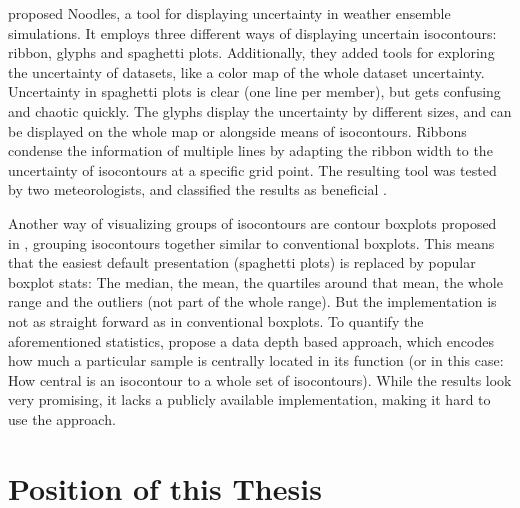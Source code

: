 \citeauthor{sanyal_noodles_2010} proposed Noodles, a tool for displaying uncertainty in weather ensemble simulations. 
It employs three different ways of displaying uncertain isocontours: ribbon, glyphs and spaghetti plots. 
Additionally, they added tools for exploring the uncertainty of datasets, like a color map of the whole dataset uncertainty.  
Uncertainty in spaghetti plots is clear (one line per member), but gets confusing and chaotic quickly. 
The glyphs display the uncertainty by different sizes,  and can be displayed on the whole map or alongside means of isocontours. 
Ribbons condense the information of multiple lines by adapting the ribbon width to the uncertainty of isocontours at a specific grid point. 
The resulting tool was tested by two meteorologists, and classified the results as beneficial \cite{sanyal_noodles_2010}.  


Another way of visualizing groups of isocontours are contour boxplots proposed in \cite{whitaker_contour_2013}, grouping isocontours together similar to conventional boxplots. 
This means that the easiest default presentation (spaghetti plots) is replaced by popular boxplot stats: The median, the mean, the quartiles around that mean, the whole range and the outliers (not part of the whole range). 
But the implementation is not as straight forward as in conventional boxplots. 
To quantify the aforementioned statistics, \citeauthor{whitaker_contour_2013} propose a data depth based approach, which encodes how much a particular sample is centrally located in its function (or in this case: How central is an isocontour to a whole set of isocontours). 
While the results look very promising, it lacks a publicly available implementation, making it hard to use the approach.

%
%
%
%


\section{Position of this Thesis} %
\label{sec:Position of this Thesis}

